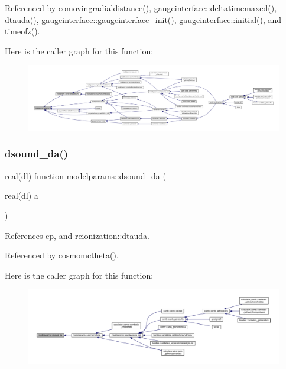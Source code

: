 Referenced by comovingradialdistance(), gaugeinterface\+::deltatimemaxed(), dtauda(), gaugeinterface\+::gaugeinterface\+\_\+init(), gaugeinterface\+::initial(), and timeofz().

Here is the caller graph for this function\+:
\nopagebreak
\begin{figure}[H]
\begin{center}
\leavevmode
\includegraphics[width=350pt]{namespacemodelparams_ae583f09e6523f430605f421d2db537ae_icgraph}
\end{center}
\end{figure}
\mbox{\label{namespacemodelparams_a60c72460cbce332f5142d619a906fa16}} 
\subsubsection{\texorpdfstring{dsound\+\_\+da()}{dsound\_da()}}
{\footnotesize\ttfamily real(dl) function modelparams\+::dsound\+\_\+da (\begin{DoxyParamCaption}\item[{real(dl)}]{a }\end{DoxyParamCaption})}



References cp, and reionization\+::dtauda.



Referenced by cosmomctheta().

Here is the caller graph for this function\+:
\nopagebreak
\begin{figure}[H]
\begin{center}
\leavevmode
\includegraphics[width=350pt]{namespacemodelparams_a60c72460cbce332f5142d619a906fa16_icgraph}
\end{center}
\end{figure}
\mbox{\label{namespacemodelparams_a57d61799939e1d3d5984dba316f8cc6a}} 
